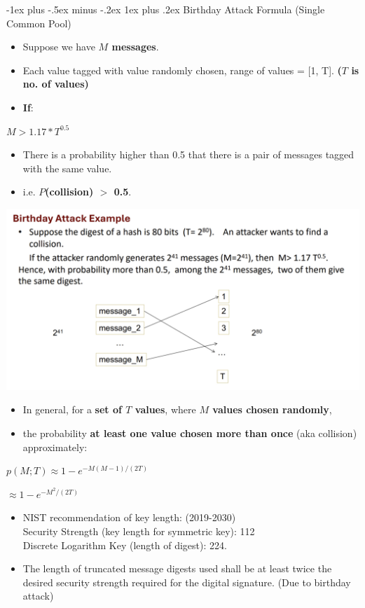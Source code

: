 \documentclass[10pt, landscape]{article}
\makeatletter
\renewcommand{\subsubsection}{\@startsection{subsubsection}{3}{0mm}%
                                {-1ex plus -.5ex minus -.2ex}%
                                {1ex plus .2ex}%
                                {\normalfont\small\bfseries}}
\makeatother
\begin{document}
\begin{multicols*}{3}
\subsubsection{Birthday Attack Formula (Single Common Pool)}
\begin{itemize}
\item Suppose we have \textbf{$M$ messages}.
\item Each value tagged with value randomly chosen, range of values = [1, T]. \textbf{($T$ is no. of values)}
\item \textbf{If}:
\end{itemize}
\centerline{$M > 1.17 * T^{0.5}$}
\begin{itemize}
\item There is a probability higher than 0.5 that there is a pair of messages tagged with the same value.
\item i.e. \textbf{$P$(collision) $>$ 0.5}.
\end{itemize}
\centerline{\includegraphics[width=1\linewidth]{birthdayAttack}}
\begin{itemize}
\item In general, for a \textbf{set of $T$ values}, where \textbf{$M$ values chosen randomly},
\item the probability \textbf{at least one value chosen more than once} (aka collision) approximately:
\end{itemize}
\centerline{$ p(M;T)\approx 1-e^{-M(M-1)/(2T)}$}
\smallskip
\centerline{$\approx 1-e^{-M^{2}/(2T)}$}
\begin{itemize}
\item NIST recommendation of key length: (2019-2030) \\
Security Strength (key length for symmetric key): 112 \\
Discrete Logarithm Key (length of digest): 224.
\item The length of truncated message digests used shall be at least twice the desired security
strength required for the digital signature. (Due to birthday attack)
\end{itemize}


\end{multicols*}
\end{document}
